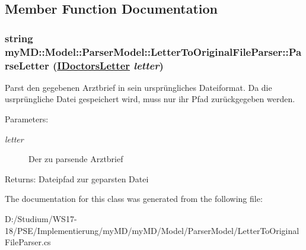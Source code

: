 \subsection{Member Function Documentation}
\hypertarget{classmy_m_d_1_1_model_1_1_parser_model_1_1_letter_to_original_file_parser_cfcef4a63742991668d3a07e4562a2f6}{
\subsubsection[ParseLetter]{\setlength{\rightskip}{0pt plus 5cm}string my\-MD::Model::Parser\-Model::Letter\-To\-Original\-File\-Parser::Parse\-Letter (\hyperlink{interfacemy_m_d_1_1_model_interface_1_1_data_model_interface_1_1_i_doctors_letter}{IDoctors\-Letter} {\em letter})}}
\label{d3/dd9/classmy_m_d_1_1_model_1_1_parser_model_1_1_letter_to_original_file_parser_cfcef4a63742991668d3a07e4562a2f6}


Parst den gegebenen Arztbrief in sein urspr\"{u}ngliches Dateiformat. Da die usrpr\"{u}ngliche Datei gespeichert wird, muss nur ihr Pfad zur\"{u}ckgegeben werden. 

\begin{Desc}
\item[Parameters:]
\begin{description}
\item[{\em letter}]Der zu parsende Arztbrief\end{description}
\end{Desc}
\begin{Desc}
\item[Returns:]Dateipfad zur geparsten Datei\end{Desc}


The documentation for this class was generated from the following file:\begin{CompactItemize}
\item 
D:/Studium/WS17-18/PSE/Implementierung/my\-MD/my\-MD/Model/Parser\-Model/Letter\-To\-Original\-File\-Parser.cs\end{CompactItemize}
